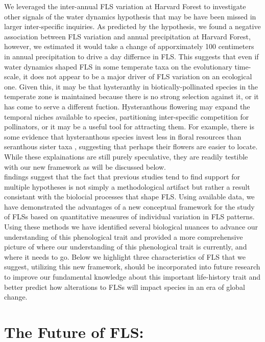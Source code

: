 \documentclass{article}
\begin{document}
{\noindent We leveraged the inter-annual FLS variation at Harvard Forest to investigate other signals of the water dynamics hypothesis that may be have been missed in larger inter-specific inquiries. As predicted by the hypothesis, we found a negative association between FLS variation and annual precipitation at Harvard Forest, however, we estimated it would take a change of apporximately 100 centimeters in annual precipitation to drive a day differnce in FLS. This suggests that even if water dynamics shaped FLS in some temperate taxa on the evolutionary time-scale, it does not appear to be a major driver of FLS variation on an ecological one. Given this, it may be that hysteranthy in biotically-pollinated species in the temperate zone is maintained because there is no strong selection against it, or it has come to serve a different fuction. Hysteranthous flowering may expand the temporal niches available to species, partitioning inter-specific competition for pollinators, or it may be a useful tool for attracting them. For example, there is some evidence that hysteranthous species invest less in floral resources than seranthous sister taxa \citep{Gunatilleke1984}, suggesting that perhaps their flowers are easier to locate. While these explainations are still purely speculative, they are readily testible with our new framework as will be discussed below.\\

\noindentOur findings suggest that the fact that previous studies tend to find support for multiple hypotheses is not simply a methodological artifact but rather a result consistant with the biolocial processes that shape FLS. Using available data, we have demonstrated the advantages of a new conceptual framework for the study of FLSs based on quantitative measures of individual variation in FLS patterns. Using these methods we have identified several biological nuances to advance our understanding of this phenological trait and provided a more comprehensive picture of where our understanding of this phenological trait is currently, and where it needs to go. Below we highlight three characteristics of FLS that we suggest, utilizing this new framework, should be incorporated into future research to improve our fundamental knowledge about this important life-history trait and better predict how alterations to FLSs will impact species in an era of global change.
\section*{The Future of FLS:}
}
\end{document}
